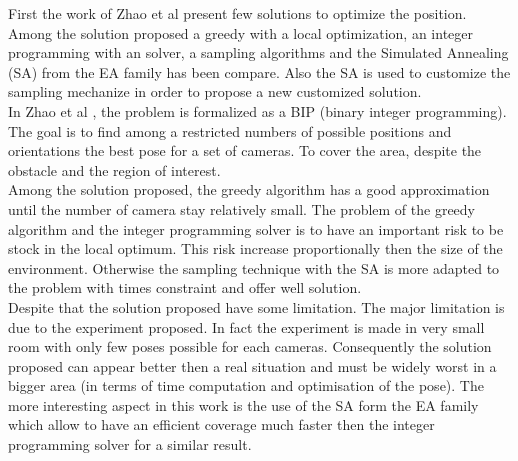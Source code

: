 First the work of Zhao et al \cite{151*zhao2013} present few solutions to optimize the position. Among the solution proposed a greedy with a local optimization, an integer programming with an solver, a sampling algorithms and the Simulated Annealing (SA) from the EA family has been compare.  Also the SA is used to customize the sampling mechanize in order to propose a new customized solution. \\
In Zhao et al \cite{151*zhao2013}, the problem is formalized as a BIP (binary integer programming).
  The goal is to find among a restricted numbers of possible positions and orientations the best pose for a set of cameras. To cover the area, despite the obstacle and the region of interest. \\
Among the solution proposed, the greedy algorithm has a good approximation until the number of camera stay relatively small. The problem of the greedy algorithm  and the integer programming solver is to have an important risk to be stock in the local optimum. This risk increase proportionally then the size of the environment. Otherwise the sampling technique with the SA  is more adapted to the problem with times constraint and offer well solution.\\
Despite that the solution proposed have some limitation. The major limitation is due to the experiment proposed. In fact the experiment is made in very small room with only few poses possible for each cameras. Consequently the solution proposed can appear better then a real situation and must be widely worst in a bigger area (in terms of time computation and optimisation of the pose). The more interesting aspect in this work \citep{151*zhao2013} is the use of the SA form the EA family which allow to have an efficient coverage much faster then the integer programming solver for a similar result. 


